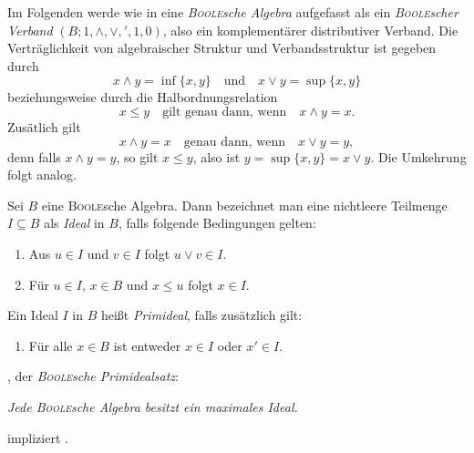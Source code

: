 Im Folgenden werde wie in \cite{graetzer2003general} eine \textit{\textsc{Boole}sche Algebra} aufgefasst als ein \textit{\textsc{Boole}scher Verband} $(B; 1, \land, \lor, ', 1, 0)$, also ein komplementärer distributiver Verband. 
Die Verträglichkeit von algebraischer Struktur und Verbandsstruktur ist gegeben durch 
\begin{displaymath}
  x \land y = \inf\{x,y\} \quad \text{und} \quad x \lor y = \sup\{x,y\}
\end{displaymath}
beziehungsweise durch die Halbordnungsrelation 
\begin{displaymath}
  x \leq y \quad \text{gilt genau dann, wenn} \quad x \land y = x.
\end{displaymath}
Zusätlich gilt 
\begin{displaymath}
  x \land y = x \quad \text{genau dann, wenn} \quad x \lor y = y,
\end{displaymath}
denn falls $x \land y = y$, so gilt $x \leq y$, also ist $y = \sup\{x,y\} = x \lor y$. 
Die Umkehrung folgt analog.

\begin{defn}
  Sei $B$ eine \textsc{Boole}sche Algebra. Dann bezeichnet man eine nichtleere Teilmenge $I \subseteq B$ als \textit{Ideal} in $B$, falls folgende Bedingungen gelten:
  \begin{enumerate}[(1)]
    \item Aus $u \in I$ und $v \in I$ folgt $u \lor v \in I$.
    \item Für $u \in I$, $x \in B$ und $x \leq u$ folgt  $x \in I$.
  \end{enumerate}
  Ein Ideal $I$ in $B$ heißt \textit{Primideal}, falls zusätzlich gilt:
  \begin{enumerate}[(3)]
    \item Für alle $x \in B$ ist entweder $x \in I$ oder $x' \in I$.
  \end{enumerate}
\end{defn}

\begin{defn}
    \PIT, der \textit{\textsc{Boole}sche Primidealsatz}:
      \begin{addmargin}[2em]{2em}%
        \textit{Jede \textsc{Boole}sche Algebra besitzt ein maximales Ideal.}
      \end{addmargin}
\end{defn}

\begin{thm}
  \label{thm:acpit}
  \AC impliziert \PIT.
\end{thm}

